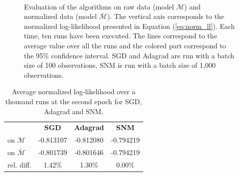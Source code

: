 \documentclass[conference]{IEEEtran}
\begin{document}
\begin{figure}[t]
    \centering
    ~
    ~
    \caption{Evaluation of the algorithms on raw data (model $\mathcal{M}$) and normalized data (model $\bar{\mathcal{M}}$). The vertical axis corresponds to the normalized log-likelihood presented in Equation (\ref{eq:norm_ll}). Each time, ten runs have been executed. The lines correspond to the average value over all the runs and the colored part correspond to the 95\% confidence interval. SGD and Adagrad are run with a batch size of 100 observations, SNM is run with a batch size of 1,000 observations.}
    \label{fig:norm_unorm}
    \vspace{-0.5cm}
\end{figure}

\begin{table}
\centering
\renewcommand\arraystretch{1.2}
\begin{tabular}{l|ccc}
\multicolumn{1}{l}{} & {\bf SGD} & {\bf Adagrad} & {\bf SNM} \\ \cline{2-4}
on $\mathcal{M}$ & -0.813107 & -0.812080 & -0.794219 \\
on $\bar{\mathcal{M}}$ & -0.801739 & -0.801646
 & -0.794219 \\ \hline
rel. diff.  & 1.42\% & 1.30\% & 0.00\%
\end{tabular}
\caption{\label{tab:res_norm_unorm} Average normalized log-likelihood over a thousand runs at the second epoch for SGD, Adagrad and SNM.}
\vspace{-0.9cm}
\end{table}
\end{document}
